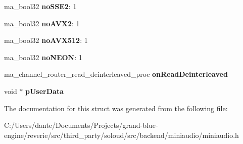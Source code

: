 \begin{DoxyCompactItemize}
ma\+\_\+bool32 {\bfseries no\+S\+S\+E2}\+: 1
\item 
\mbox{\label{structma__channel__router__config_a88e7e59e716ee7d3da4d0fefb82f12a3}} 
ma\+\_\+bool32 {\bfseries no\+A\+V\+X2}\+: 1
\item 
\mbox{\label{structma__channel__router__config_a4945527ab551c08e8c8e072967ea7a0d}} 
ma\+\_\+bool32 {\bfseries no\+A\+V\+X512}\+: 1
\item 
\mbox{\label{structma__channel__router__config_ad1a3bcdaa7409a4c03b68bbbb8e44905}} 
ma\+\_\+bool32 {\bfseries no\+N\+E\+ON}\+: 1
\item 
\mbox{\label{structma__channel__router__config_a1db819cdea2173a573124281ccd75a4d}} 
ma\+\_\+channel\+\_\+router\+\_\+read\+\_\+deinterleaved\+\_\+proc {\bfseries on\+Read\+Deinterleaved}
\item 
\mbox{\label{structma__channel__router__config_af1e029cf731dfbbfeadc22321b612cdc}} 
void $\ast$ {\bfseries p\+User\+Data}
\end{DoxyCompactItemize}


The documentation for this struct was generated from the following file\+:\begin{DoxyCompactItemize}
\item 
C\+:/\+Users/dante/\+Documents/\+Projects/grand-\/blue-\/engine/reverie/src/third\+\_\+party/soloud/src/backend/miniaudio/miniaudio.\+h\end{DoxyCompactItemize}
